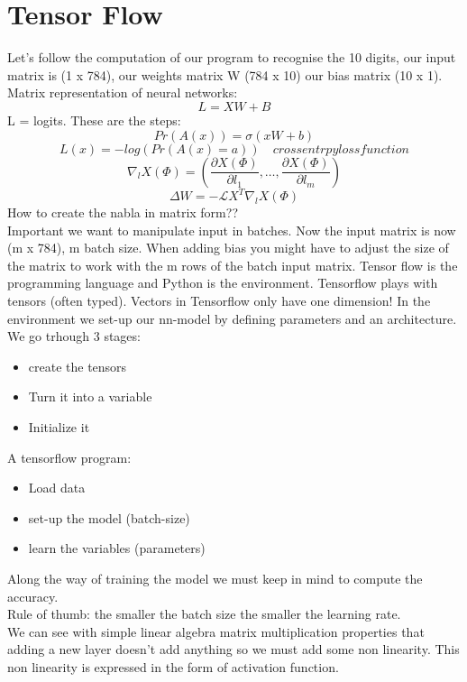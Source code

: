 \section{Tensor Flow}
Let's follow the computation of our program to recognise the 10 digits, our input matrix is (1 x 784), our weights matrix W (784 x 10) our bias matrix (10 x 1).\\
Matrix representation of neural networks:
\[ 
     L = XW + B
\]L = logits. These are the steps:\[ 
    Pr(A(x)) = \sigma(xW +b) 
\]
\[ 
    L(x) = -log(Pr(A(x)=a)) \quad cross entrpy loss function
\]
\[ 
    \nabla_l X(\Phi) = \left( \frac{\partial X(\Phi)}{\partial l_1}, \ldots, \frac{\partial X(\Phi)}{\partial l_m} \right) 
\]
\[ 
    \Delta W = -\mathcal{L}X^T\nabla_l X(\Phi) 
\]How to create the nabla in matrix form??\\
Important we want to manipulate input in batches. Now the input matrix is now (m x 784), m batch size. When adding bias you might have to adjust the size of the matrix to work with the m rows of the batch input matrix. Tensor flow is the programming language and Python is the environment. Tensorflow plays with tensors (often typed). Vectors in Tensorflow only have one dimension! In the environment we set-up our nn-model by defining parameters and an architecture. We go trhough 3 stages: 
\begin{itemize}
    \item create the tensors
    \item Turn it into a variable
    \item Initialize it
\end{itemize}
A tensorflow program:
\begin{itemize}
    \item Load data
    \item set-up the model (batch-size)
    \item learn the variables (parameters)
\end{itemize}
Along the way of training the model we must keep in mind to compute the accuracy.\\ Rule of thumb: the smaller the batch size the smaller the learning rate.\\
We can see with simple linear algebra matrix multiplication properties that adding a new layer doesn't add anything so we must add some non linearity. This non linearity is expressed in the form of activation function.
